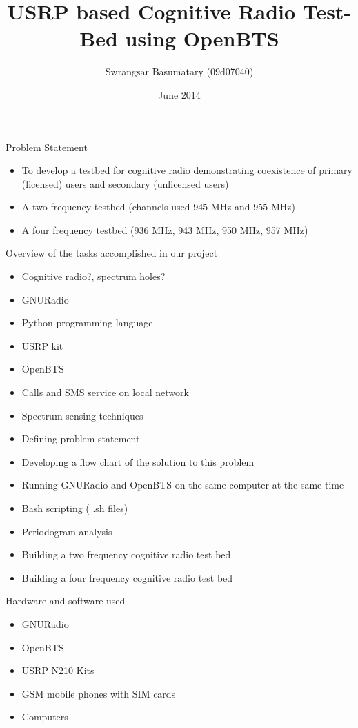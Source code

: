 \documentclass{beamer}
\title{USRP based Cognitive Radio Test-Bed using OpenBTS}
\author{Swrangsar Basumatary (09d07040)}
\institute{Department of Electrical Engineering \\ IIT Bombay, Powai}
\date{June 2014}
\begin{document}
  \frame{\titlepage}


	\begin{frame}{Problem Statement}
    	\begin{itemize}
    		\item To develop a testbed for cognitive radio demonstrating coexistence of primary (licensed) users and secondary (unlicensed users)
    		\item A two frequency testbed (channels used 945 MHz and 955 MHz)
    		\item A four frequency testbed (936 MHz, 943 MHz, 950 MHz, 957 MHz)
    	\end{itemize}
	\end{frame}
	
	\begin{frame}{Overview of the tasks accomplished in our project}
		\begin{itemize}
      \item Cognitive radio?,  spectrum holes?
      \item GNURadio
      \item Python programming language
      \item USRP kit
      \item OpenBTS
      \item Calls and SMS service on local network
      \item Spectrum sensing techniques
      \item Defining problem statement
    \end{itemize}
  \end{frame}
    
    \begin{frame}{}
        \begin{itemize}
		\item Developing a flow chart of the solution to this problem
		\item Running GNURadio and OpenBTS  on the same computer at the same time
		\item Bash scripting ( .sh files)
		\item Periodogram analysis
		\item Building a two frequency cognitive radio test bed
		\item Building a four frequency cognitive radio test bed
		\end{itemize}
	\end{frame}
	
	\begin{frame}{Hardware and software used}
    \begin{itemize}
      \item GNURadio
      \item OpenBTS
      \item USRP N210  Kits
      \item GSM mobile phones with SIM cards
      \item Computers
    \end{itemize}
  \end{frame}
\end{document}
